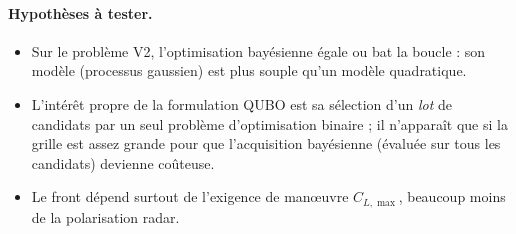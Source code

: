 \documentclass[11pt,a4paper]{report}
\begin{document}
\paragraph{Hypothèses à tester.}
\begin{itemize}
\item[H1.] Sur le problème V2, l'optimisation bayésienne égale ou bat la boucle : son modèle (processus gaussien) est plus souple qu'un modèle quadratique.
\item[H2.] L'intérêt propre de la formulation QUBO est sa sélection d'un \emph{lot} de candidats par un seul problème d'optimisation binaire ; il n'apparaît que si la grille est assez grande pour que l'acquisition bayésienne (évaluée sur tous les candidats) devienne coûteuse.
\item[H3.] Le front dépend surtout de l'exigence de manœuvre $C_{L,\max}$, beaucoup moins de la polarisation radar.
\end{itemize}
\end{document}
